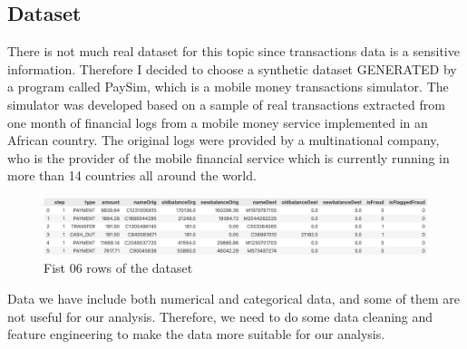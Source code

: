 \subsection{Dataset}
There is not much real dataset for this topic since transactions data is a sensitive information. Therefore I decided to choose a synthetic dataset GENERATED by a program called PaySim, which is a mobile money transactions simulator. The simulator was developed based on a sample of real transactions extracted from one month of financial logs from a mobile money service implemented in an African country. The original logs were provided by a multinational company, who is the provider of the mobile financial service which is currently running in more than 14 countries all around the world. 

\begin{figure}
  \centering
  \includegraphics[width=\linewidth]{body/02_methodology/img/figure1.png}
  \caption{Fist 06 rows of the dataset}
\end{figure}

Data we have include both numerical and categorical data, and some of them are not useful for our analysis. Therefore, we need to do some data cleaning and feature engineering to make the data more suitable for our analysis.